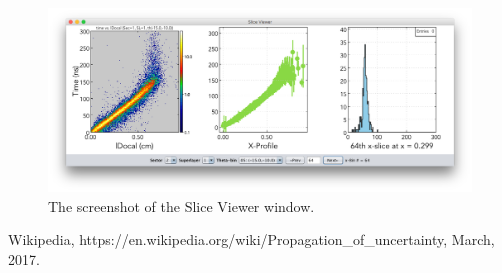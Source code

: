 \documentclass[12pt,epsfig]{article}
\begin{document}
\begin{figure} [H] %
    \centering
    \includegraphics[width=1.0\textwidth]{Figures/Screenshots/screenShotSliceViewer.png}
    \caption{The screenshot of the Slice Viewer window.}
    \label{fSliceViewer}
\end{figure}



\appendix
\appendixpage








\begin{thebibliography}{9}
   Wikipedia, https://en.wikipedia.org/wiki/Propagation\_of\_uncertainty, March, 2017.
\end{thebibliography}
\end{document}
